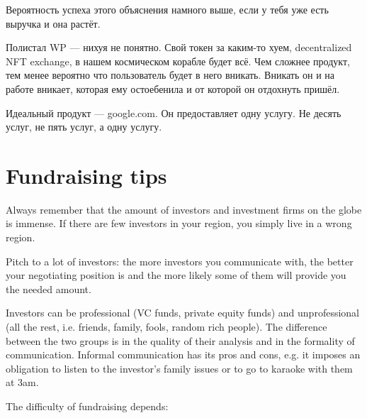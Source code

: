 \documentclass[11pt]{article}
\theoremstyle{remark}
\theoremstyle{definition}
\begin{document}
Вероятность успеха этого объяснения намного выше, если у тебя уже есть выручка и она растёт.

Полистал WP — нихуя не понятно. Свой токен за каким-то хуем, decentralized NFT exchange, в нашем космическом корабле будет всё. Чем сложнее продукт, тем менее вероятно что пользователь будет в него вникать. Вникать он и на работе вникает, которая ему остоебенила и от которой он отдохнуть пришёл.

Идеальный продукт — google.com. Он предоставляет одну услугу. Не десять услуг, не пять услуг, а одну услугу.





\section{Fundraising tips}





Always remember that the amount of investors and investment firms on the globe is immense. If there are few investors in your region, you simply live in a wrong region.




Pitch to a lot of investors: the more investors you communicate with, the better your negotiating position is and the more likely some of them will provide you the needed amount.





Investors can be professional (VC funds, private equity funds) and unprofessional (all the rest, i.e. friends, family, fools, random rich people). The difference between the two groups is in the quality of their analysis and in the formality of communication. Informal communication has its pros and cons, e.g. it imposes an obligation to listen to the investor's family issues or to go to karaoke with them at 3am.




The difficulty of fundraising depends:
\end{document}
